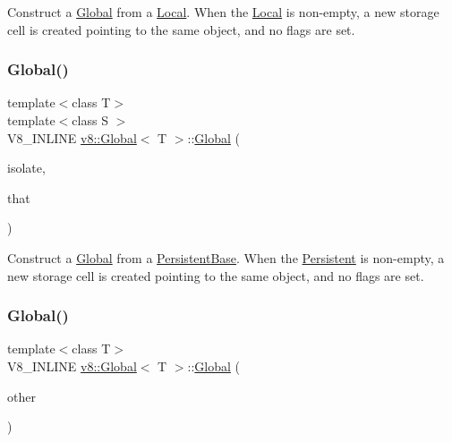 Construct a \mbox{\hyperlink{classv8_1_1Global}{Global}} from a \mbox{\hyperlink{classv8_1_1Local}{Local}}. When the \mbox{\hyperlink{classv8_1_1Local}{Local}} is non-\/empty, a new storage cell is created pointing to the same object, and no flags are set. \mbox{\label{classv8_1_1Global_a6243ecb28bb97d066065796fa28f7415}} 
\subsubsection{\texorpdfstring{Global()}{Global()}\hspace{0.1cm}{\footnotesize\ttfamily [3/4]}}
{\footnotesize\ttfamily template$<$class T$>$ \\
template$<$class S $>$ \\
V8\+\_\+\+I\+N\+L\+I\+NE \mbox{\hyperlink{classv8_1_1Global}{v8\+::\+Global}}$<$ T $>$\+::\mbox{\hyperlink{classv8_1_1Global}{Global}} (\begin{DoxyParamCaption}\item[{\mbox{\hyperlink{classv8_1_1Isolate}{Isolate}} $\ast$}]{isolate,  }\item[{const \mbox{\hyperlink{classv8_1_1PersistentBase}{Persistent\+Base}}$<$ S $>$ \&}]{that }\end{DoxyParamCaption})\hspace{0.3cm}{\ttfamily [inline]}}

Construct a \mbox{\hyperlink{classv8_1_1Global}{Global}} from a \mbox{\hyperlink{classv8_1_1PersistentBase}{Persistent\+Base}}. When the \mbox{\hyperlink{classv8_1_1Persistent}{Persistent}} is non-\/empty, a new storage cell is created pointing to the same object, and no flags are set. \mbox{\label{classv8_1_1Global_ab8f3c754a58146e6db67012cd74a49cb}} 
\subsubsection{\texorpdfstring{Global()}{Global()}\hspace{0.1cm}{\footnotesize\ttfamily [4/4]}}
{\footnotesize\ttfamily template$<$class T$>$ \\
V8\+\_\+\+I\+N\+L\+I\+NE \mbox{\hyperlink{classv8_1_1Global}{v8\+::\+Global}}$<$ T $>$\+::\mbox{\hyperlink{classv8_1_1Global}{Global}} (\begin{DoxyParamCaption}\item[{\mbox{\hyperlink{classv8_1_1Global}{Global}}$<$ T $>$ \&\&}]{other }\end{DoxyParamCaption})\hspace{0.3cm}{\ttfamily [inline]}}

